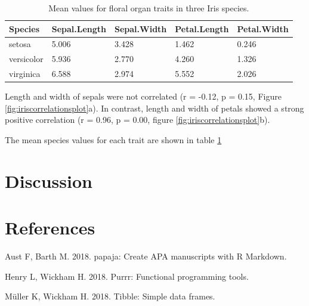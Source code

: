 \documentclass[man,floatsintext]{apa6}
\begin{document}
\begin{table}[tbp]
\begin{center}
\begin{threeparttable}
\caption{\label{tab:speciesmeanstable}Mean values for floral organ traits in three Iris species.}
\small{
\begin{tabular}{lllll}
\toprule
Species & \multicolumn{1}{c}{Sepal.Length} & \multicolumn{1}{c}{Sepal.Width} & \multicolumn{1}{c}{Petal.Length} & \multicolumn{1}{c}{Petal.Width}\\
\midrule
setosa & 5.006 & 3.428 & 1.462 & 0.246\\
versicolor & 5.936 & 2.770 & 4.260 & 1.326\\
virginica & 6.588 & 2.974 & 5.552 & 2.026\\
\bottomrule
\end{tabular}
}
\end{threeparttable}
\end{center}
\end{table}

Length and width of sepals were not correlated (r = -0.12, p = 0.15,
Figure \ref{fig:iriscorrelationsplot}a). In contrast, length and width
of petals showed a strong positive correlation (r = 0.96, p = 0.00,
figure \ref{fig:iriscorrelationsplot}b).

The mean species values for each trait are shown in table
\ref{tab:speciesmeanstable}

\hypertarget{discussion}{%
\section{Discussion}\label{discussion}}

\newpage

\hypertarget{references}{%
\section{References}\label{references}}

\begingroup
\setlength{\parindent}{-0.5in}
\setlength{\leftskip}{0.5in}

\hypertarget{refs}{}
\leavevmode\hypertarget{ref-R-papaja}{}%
Aust F, Barth M. 2018. papaja: Create APA manuscripts with R Markdown.

\leavevmode\hypertarget{ref-R-purrr}{}%
Henry L, Wickham H. 2018. Purrr: Functional programming tools.

\leavevmode\hypertarget{ref-R-tibble}{}%
Müller K, Wickham H. 2018. Tibble: Simple data frames.
\end{document}
